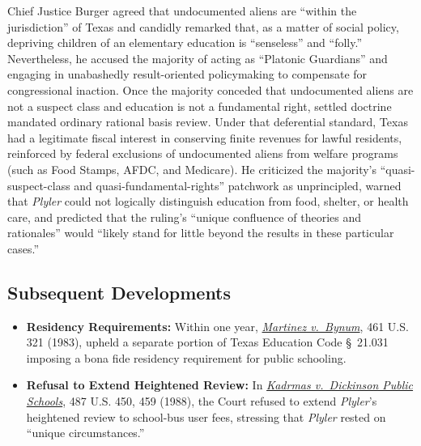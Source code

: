 \documentclass[12pt]{article}
\begin{document}
Chief Justice Burger agreed that undocumented aliens are ``within the jurisdiction'' of Texas and candidly remarked that, as a matter of social policy, depriving children of an elementary education is ``senseless'' and ``folly.'' Nevertheless, he accused the majority of acting as ``Platonic Guardians'' and engaging in unabashedly result-oriented policymaking to compensate for congressional inaction. Once the majority conceded that undocumented aliens are not a suspect class and education is not a fundamental right, settled doctrine mandated ordinary rational basis review. Under that deferential standard, Texas had a legitimate fiscal interest in conserving finite revenues for lawful residents, reinforced by federal exclusions of undocumented aliens from welfare programs (such as Food Stamps, AFDC, and Medicare). He criticized the majority's ``quasi-suspect-class and quasi-fundamental-rights'' patchwork as unprincipled, warned that \textit{Plyler} could not logically distinguish education from food, shelter, or health care, and predicted that the ruling's ``unique confluence of theories and rationales'' would ``likely stand for little beyond the results in these particular cases.''

\subsection{Subsequent Developments}

\begin{itemize}

\item \textbf{Residency Requirements:} Within one year, \href{https://supreme.justia.com/cases/federal/us/461/321/}{\textit{Martinez v.\ Bynum}}, 461 U.S. 321 (1983), upheld a separate portion of Texas Education Code \S~21.031 imposing a bona fide residency requirement for public schooling.

\item \textbf{Refusal to Extend Heightened Review:} In \href{https://supreme.justia.com/cases/federal/us/487/450/}{\textit{Kadrmas v.\ Dickinson Public Schools}}, 487 U.S. 450, 459 (1988), the Court refused to extend \textit{Plyler}'s heightened review to school-bus user fees, stressing that \textit{Plyler} rested on ``unique circumstances.''

\end{itemize}
\end{document}
